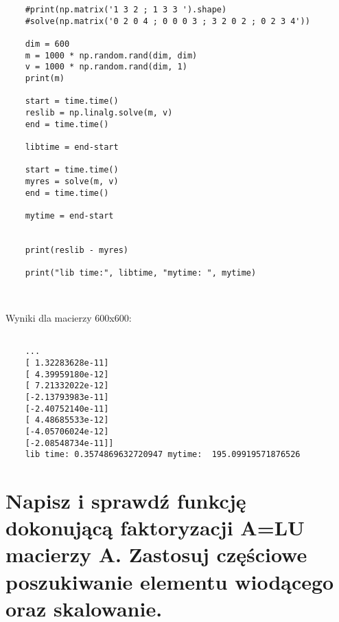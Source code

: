 \begin{verbatim}
    #print(np.matrix('1 3 2 ; 1 3 3 ').shape)
    #solve(np.matrix('0 2 0 4 ; 0 0 0 3 ; 3 2 0 2 ; 0 2 3 4'))
    
    dim = 600
    m = 1000 * np.random.rand(dim, dim)
    v = 1000 * np.random.rand(dim, 1)
    print(m)
    
    start = time.time()
    reslib = np.linalg.solve(m, v)
    end = time.time()
    
    libtime = end-start
    
    start = time.time()
    myres = solve(m, v)
    end = time.time()
    
    mytime = end-start
    
    
    print(reslib - myres)
    
    print("lib time:", libtime, "mytime: ", mytime)
    
    

\end{verbatim}


Wyniki dla macierzy 600x600:

\begin{lstlisting}

	...
	[ 1.32283628e-11]
	[ 4.39959180e-12]
	[ 7.21332022e-12]
	[-2.13793983e-11]
	[-2.40752140e-11]
	[ 4.48685533e-12]
	[-4.05706024e-12]
	[-2.08548734e-11]]
	lib time: 0.3574869632720947 mytime:  195.09919571876526
\end{lstlisting}


\section{Napisz i sprawdź funkcję dokonującą faktoryzacji A=LU macierzy A. Zastosuj częściowe poszukiwanie elementu wiodącego oraz skalowanie.}

